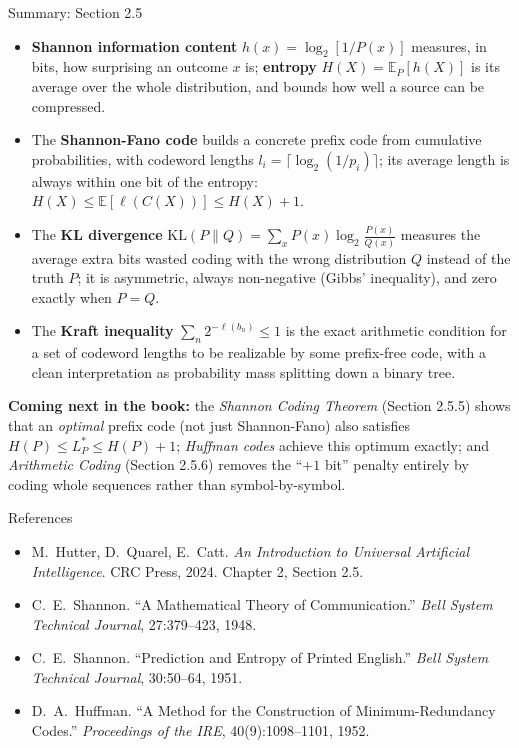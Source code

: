 \documentclass[aspectratio=169,10pt]{beamer}
\newcommand{\bbE}{\mathbb{E}}
\begin{document}
\begin{frame}{Summary: Section 2.5}

\begin{itemize}
  \item \textbf{Shannon information content} $h(x) = \log_2[1/P(x)]$
    measures, in bits, how surprising an outcome $x$ is; \textbf{entropy}
    $H(X) = \bbE_P[h(X)]$ is its average over the whole distribution, and
    bounds how well a source can be compressed.
  \item The \textbf{Shannon-Fano code} builds a concrete prefix code from
    cumulative probabilities, with codeword lengths $l_i = \lceil
    \log_2(1/p_i)\rceil$; its average length is always within one bit of the
    entropy: $H(X) \le \bbE[\ell(C(X))] \le H(X)+1$.
  \item The \textbf{KL divergence} $\mathrm{KL}(P\|Q) = \sum_x P(x)\log_2
    \frac{P(x)}{Q(x)}$ measures the average extra bits wasted coding with the
    wrong distribution $Q$ instead of the truth $P$; it is asymmetric,
    always non-negative (Gibbs' inequality), and zero exactly when $P=Q$.
  \item The \textbf{Kraft inequality} $\sum_n 2^{-\ell(b_n)} \le 1$ is the
    exact arithmetic condition for a set of codeword lengths to be
    realizable by some prefix-free code, with a clean interpretation as
    probability mass splitting down a binary tree.
\end{itemize}

\medskip
\textbf{Coming next in the book:} the \emph{Shannon Coding Theorem}
(Section 2.5.5) shows that an \emph{optimal} prefix code (not just
Shannon-Fano) also satisfies $H(P) \le L^*_P \le H(P)+1$; \emph{Huffman
codes} achieve this optimum exactly; and \emph{Arithmetic Coding}
(Section 2.5.6) removes the ``$+1$ bit'' penalty entirely by coding whole
sequences rather than symbol-by-symbol.
\end{frame}

\begin{frame}{References}
\begin{itemize}
  \item M.\ Hutter, D.\ Quarel, E.\ Catt. \emph{An Introduction to Universal
    Artificial Intelligence}. CRC Press, 2024. Chapter 2, Section 2.5.
  \item C.\ E.\ Shannon. ``A Mathematical Theory of Communication.'' \emph{Bell
    System Technical Journal}, 27:379--423, 1948.
  \item C.\ E.\ Shannon. ``Prediction and Entropy of Printed English.''
    \emph{Bell System Technical Journal}, 30:50--64, 1951.
  \item D.\ A.\ Huffman. ``A Method for the Construction of Minimum-Redundancy
    Codes.'' \emph{Proceedings of the IRE}, 40(9):1098--1101, 1952.
\end{itemize}
\end{frame}
\end{document}
